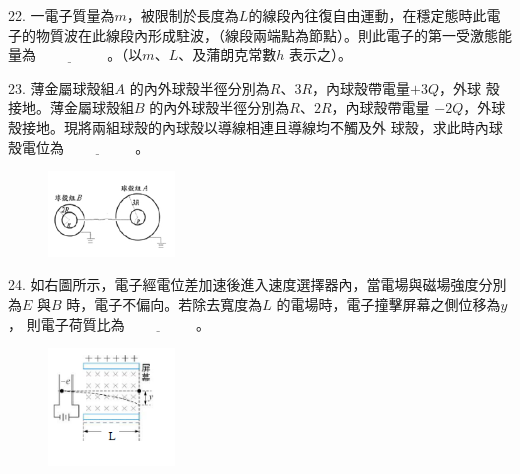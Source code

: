 \documentclass[cn,10pt,math=newtx]{elegantbook}
\begin{document}
\begin{example}
   22. 一電子質量為$m$，被限制於長度為$L$的線段內往復自由運動，在穩定態時此電子的物質波在此線段內形成駐波，（線段兩端點為節點）。則此電子的第一受激態能量為$\underline{\hspace{2cm}}$ 。（以$m、L$、及蒲朗克常數$h$
表示之）。\\
    \rightline{[中壢高中教甄109]}
\end{example}
\begin{solution}
    
\end{solution}

\newpage

\begin{example}
   23. 薄金屬球殼組$A$ 的內外球殼半徑分別為$R$、$3R$，內球殼帶電量$+3Q$，外球
殼接地。薄金屬球殼組$B$ 的內外球殼半徑分別為$R$、$2R$，內球殼帶電量
$-2Q$，外球殼接地。現將兩組球殼的內球殼以導線相連且導線均不觸及外
球殼，求此時內球殼電位為$\underline{\hspace{2cm}}$ 。\\
    \rightline{[中壢高中教甄109]}
\end{example}
\begin{solution}
    
\end{solution}
\begin{figure}[htbp]
    \flushright
    \includegraphics[width=0.3\textwidth]{image/109中壢23.png}
  \end{figure}
\newpage

\begin{example}
   24. 如右圖所示，電子經電位差加速後進入速度選擇器內，當電場與磁場強度分別為$E$
與$B$ 時，電子不偏向。若除去寬度為$L$ 的電場時，電子撞擊屏幕之側位移為$y$，
則電子荷質比為$\underline{\hspace{2cm}}$ 。\\
    \rightline{[中壢高中教甄109]}
\end{example}
\begin{solution}
    
\end{solution}
\begin{figure}[htbp]
    \flushright
    \includegraphics[width=0.3\textwidth]{image/109中壢24.png}
  \end{figure}
\newpage
\end{document}
